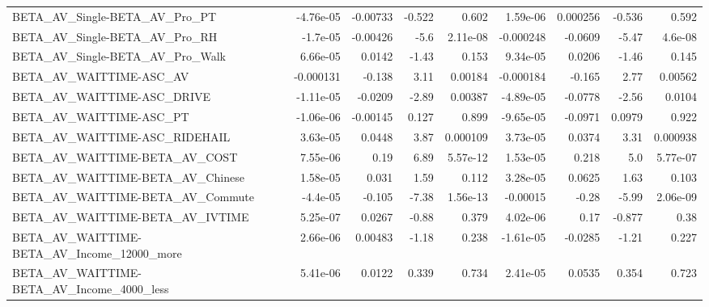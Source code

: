 \begin{tabular}{lrrrrrrrr}
BETA\_AV\_Single-BETA\_AV\_Pro\_PT                      &   -4.76e-05 &     -0.00733 &    -0.522 &    0.602 &   1.59e-06 &    0.000256 &       -0.536 &         0.592 \\
BETA\_AV\_Single-BETA\_AV\_Pro\_RH                      &    -1.7e-05 &     -0.00426 &      -5.6 & 2.11e-08 &  -0.000248 &     -0.0609 &        -5.47 &       4.6e-08 \\
BETA\_AV\_Single-BETA\_AV\_Pro\_Walk                    &    6.66e-05 &       0.0142 &     -1.43 &    0.153 &   9.34e-05 &      0.0206 &        -1.46 &         0.145 \\
BETA\_AV\_WAITTIME-ASC\_AV                            &   -0.000131 &       -0.138 &      3.11 &  0.00184 &  -0.000184 &      -0.165 &         2.77 &       0.00562 \\
BETA\_AV\_WAITTIME-ASC\_DRIVE                         &   -1.11e-05 &      -0.0209 &     -2.89 &  0.00387 &  -4.89e-05 &     -0.0778 &        -2.56 &        0.0104 \\
BETA\_AV\_WAITTIME-ASC\_PT                            &   -1.06e-06 &     -0.00145 &     0.127 &    0.899 &  -9.65e-05 &     -0.0971 &       0.0979 &         0.922 \\
BETA\_AV\_WAITTIME-ASC\_RIDEHAIL                      &    3.63e-05 &       0.0448 &      3.87 & 0.000109 &   3.73e-05 &      0.0374 &         3.31 &      0.000938 \\
BETA\_AV\_WAITTIME-BETA\_AV\_COST                      &    7.55e-06 &         0.19 &      6.89 & 5.57e-12 &   1.53e-05 &       0.218 &          5.0 &      5.77e-07 \\
BETA\_AV\_WAITTIME-BETA\_AV\_Chinese                   &    1.58e-05 &        0.031 &      1.59 &    0.112 &   3.28e-05 &      0.0625 &         1.63 &         0.103 \\
BETA\_AV\_WAITTIME-BETA\_AV\_Commute                   &    -4.4e-05 &       -0.105 &     -7.38 & 1.56e-13 &   -0.00015 &       -0.28 &        -5.99 &      2.06e-09 \\
BETA\_AV\_WAITTIME-BETA\_AV\_IVTIME                    &    5.25e-07 &       0.0267 &     -0.88 &    0.379 &   4.02e-06 &        0.17 &       -0.877 &          0.38 \\
BETA\_AV\_WAITTIME-BETA\_AV\_Income\_12000\_more         &    2.66e-06 &      0.00483 &     -1.18 &    0.238 &  -1.61e-05 &     -0.0285 &        -1.21 &         0.227 \\
BETA\_AV\_WAITTIME-BETA\_AV\_Income\_4000\_less          &    5.41e-06 &       0.0122 &     0.339 &    0.734 &   2.41e-05 &      0.0535 &        0.354 &         0.723 \\

\end{tabular}
